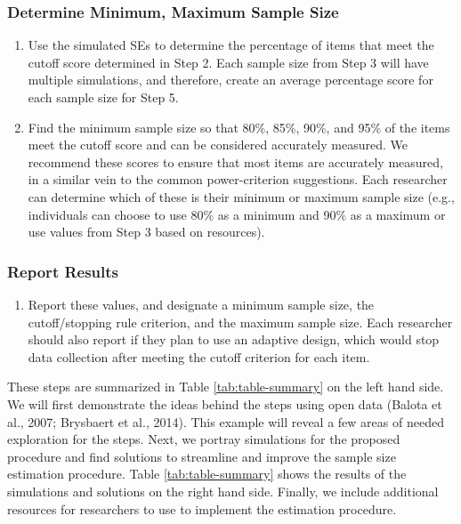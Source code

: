 \documentclass[
  man]{apa7}
\providecommand{\tightlist}{%
  \setlength{\itemsep}{0pt}\setlength{\parskip}{0pt}}
\begin{document}
\subsubsection{Determine Minimum, Maximum Sample Size}\label{determine-minimum-maximum-sample-size}

\begin{enumerate}
\def\labelenumi{\arabic{enumi})}
\setcounter{enumi}{3}
\item
  Use the simulated SEs to determine the percentage of items that meet the cutoff score determined in Step 2. Each sample size from Step 3 will have multiple simulations, and therefore, create an average percentage score for each sample size for Step 5.
\item
  Find the minimum sample size so that 80\%, 85\%, 90\%, and 95\% of the items meet the cutoff score and can be considered accurately measured. We recommend these scores to ensure that most items are accurately measured, in a similar vein to the common power-criterion suggestions. Each researcher can determine which of these is their minimum or maximum sample size (e.g., individuals can choose to use 80\% as a minimum and 90\% as a maximum or use values from Step 3 based on resources).
\end{enumerate}

\subsubsection{Report Results}\label{report-results}

\begin{enumerate}
\def\labelenumi{\arabic{enumi})}
\setcounter{enumi}{5}
\tightlist
\item
  Report these values, and designate a minimum sample size, the cutoff/stopping rule criterion, and the maximum sample size. Each researcher should also report if they plan to use an adaptive design, which would stop data collection after meeting the cutoff criterion for each item.
\end{enumerate}

These steps are summarized in Table \ref{tab:table-summary} on the left hand side. We will first demonstrate the ideas behind the steps using open data (Balota et al., 2007; Brysbaert et al., 2014). This example will reveal a few areas of needed exploration for the steps. Next, we portray simulations for the proposed procedure and find solutions to streamline and improve the sample size estimation procedure. Table \ref{tab:table-summary} shows the results of the simulations and solutions on the right hand side. Finally, we include additional resources for researchers to use to implement the estimation procedure.
\end{document}
